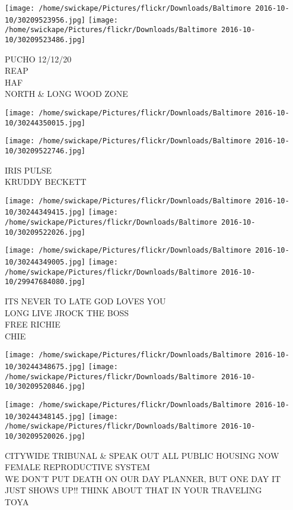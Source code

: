 \documentclass[10pt,letterpaper]{article}
\begin{document}
\texttt{[image: /home/swickape/Pictures/flickr/Downloads/Baltimore 2016-10-10/30209523956.jpg]}
\texttt{[image: /home/swickape/Pictures/flickr/Downloads/Baltimore 2016-10-10/30209523486.jpg]}

PUCHO 12/12/20\\
REAP\\
HAF\\
NORTH \& LONG WOOD ZONE\\
\pagebreak

\texttt{[image: /home/swickape/Pictures/flickr/Downloads/Baltimore 2016-10-10/30244350015.jpg]}

\vspace{0.25in}
\texttt{[image: /home/swickape/Pictures/flickr/Downloads/Baltimore 2016-10-10/30209522746.jpg]}

IRIS PULSE\\
KRUDDY BECKETT\\
\pagebreak

\texttt{[image: /home/swickape/Pictures/flickr/Downloads/Baltimore 2016-10-10/30244349415.jpg]}
\texttt{[image: /home/swickape/Pictures/flickr/Downloads/Baltimore 2016-10-10/30209522026.jpg]}

\texttt{[image: /home/swickape/Pictures/flickr/Downloads/Baltimore 2016-10-10/30244349005.jpg]}
\texttt{[image: /home/swickape/Pictures/flickr/Downloads/Baltimore 2016-10-10/29947684080.jpg]}

ITS NEVER TO LATE GOD LOVES YOU\\
LONG LIVE JROCK THE BOSS\\
FREE RICHIE\\
CHIE\\
\pagebreak

\texttt{[image: /home/swickape/Pictures/flickr/Downloads/Baltimore 2016-10-10/30244348675.jpg]}
\texttt{[image: /home/swickape/Pictures/flickr/Downloads/Baltimore 2016-10-10/30209520846.jpg]}

\texttt{[image: /home/swickape/Pictures/flickr/Downloads/Baltimore 2016-10-10/30244348145.jpg]}
\texttt{[image: /home/swickape/Pictures/flickr/Downloads/Baltimore 2016-10-10/30209520026.jpg]}

CITYWIDE TRIBUNAL \& SPEAK OUT ALL PUBLIC HOUSING NOW\\
FEMALE REPRODUCTIVE SYSTEM\\
WE DON'T PUT DEATH ON OUR DAY PLANNER, BUT ONE DAY IT JUST SHOWS UP!! THINK ABOUT THAT IN YOUR TRAVELING\\
TOYA\\
\pagebreak
\end{document}
